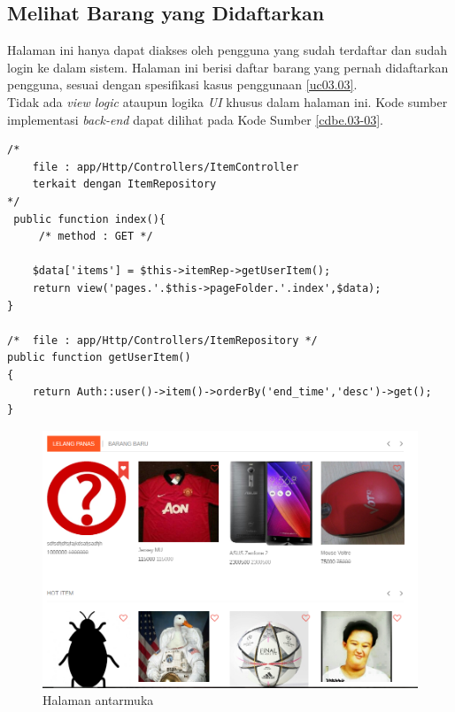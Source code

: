 \subsection{Melihat Barang yang Didaftarkan}
Halaman ini hanya dapat diakses oleh pengguna yang sudah terdaftar dan sudah login ke dalam sistem. Halaman ini berisi daftar barang yang pernah didaftarkan pengguna, sesuai dengan spesifikasi kasus penggunaan \ref{uc03.03}.\\
\indent Tidak ada \textit{view logic} ataupun logika \textit{UI} khusus dalam halaman ini. Kode sumber implementasi \textit{back-end} dapat dilihat pada Kode Sumber \ref{cdbe.03-03}.

\begin{lstlisting}[label=cdbe.03-03,style=php,caption=Kode Sumber \textit{Back-end} Melihat Barang yang Pernah Didaftarkan]
/*	
	file : app/Http/Controllers/ItemController
	terkait dengan ItemRepository
*/
 public function index(){
	 /*	method : GET */
	
    $data['items'] = $this->itemRep->getUserItem();
    return view('pages.'.$this->pageFolder.'.index',$data);
}

/*	file : app/Http/Controllers/ItemRepository */
public function getUserItem()
{
    return Auth::user()->item()->orderBy('end_time','desc')->get();
}
\end{lstlisting}

\begin{figure}[H]
	\centering
	\includegraphics[width=\textwidth]{images/bab4/ui/02-01.png}
	\caption{Halaman antarmuka }
	\label{ui.02-01}
\end{figure}

